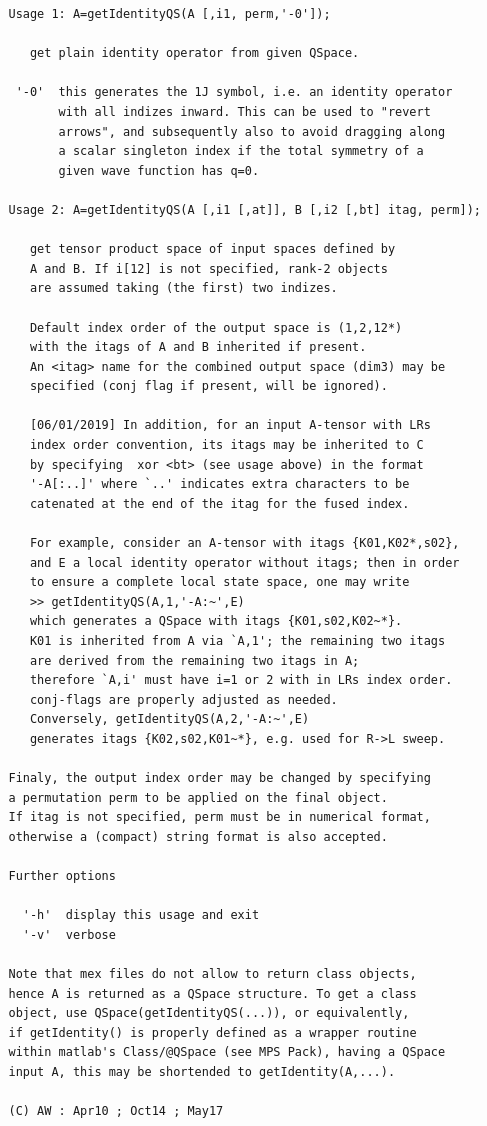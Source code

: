 \documentclass[twoside,12pt]{article}
\begin{document}
\pagebreak[3]



\begin{verbatim}
   Usage 1: A=getIdentityQS(A [,i1, perm,'-0']);
 
      get plain identity operator from given QSpace.
 
    '-0'  this generates the 1J symbol, i.e. an identity operator
          with all indizes inward. This can be used to "revert
          arrows", and subsequently also to avoid dragging along
          a scalar singleton index if the total symmetry of a
          given wave function has q=0.
 
   Usage 2: A=getIdentityQS(A [,i1 [,at]], B [,i2 [,bt] itag, perm]);
 
      get tensor product space of input spaces defined by
      A and B. If i[12] is not specified, rank-2 objects
      are assumed taking (the first) two indizes.
 
      Default index order of the output space is (1,2,12*)
      with the itags of A and B inherited if present.
      An <itag> name for the combined output space (dim3) may be
      specified (conj flag if present, will be ignored).
 
      [06/01/2019] In addition, for an input A-tensor with LRs
      index order convention, its itags may be inherited to C
      by specifying  xor <bt> (see usage above) in the format
      '-A[:..]' where `..' indicates extra characters to be
      catenated at the end of the itag for the fused index.
 
      For example, consider an A-tensor with itags {K01,K02*,s02},
      and E a local identity operator without itags; then in order
      to ensure a complete local state space, one may write
      >> getIdentityQS(A,1,'-A:~',E)
      which generates a QSpace with itags {K01,s02,K02~*}.
      K01 is inherited from A via `A,1'; the remaining two itags
      are derived from the remaining two itags in A;
      therefore `A,i' must have i=1 or 2 with in LRs index order.
      conj-flags are properly adjusted as needed.
      Conversely, getIdentityQS(A,2,'-A:~',E)
      generates itags {K02,s02,K01~*}, e.g. used for R->L sweep.
 
   Finaly, the output index order may be changed by specifying
   a permutation perm to be applied on the final object.
   If itag is not specified, perm must be in numerical format,
   otherwise a (compact) string format is also accepted.
 
   Further options
 
     '-h'  display this usage and exit
     '-v'  verbose
 
   Note that mex files do not allow to return class objects,
   hence A is returned as a QSpace structure. To get a class
   object, use QSpace(getIdentityQS(...)), or equivalently,
   if getIdentity() is properly defined as a wrapper routine
   within matlab's Class/@QSpace (see MPS Pack), having a QSpace
   input A, this may be shortended to getIdentity(A,...).
 
   (C) AW : Apr10 ; Oct14 ; May17
\end{verbatim}
\end{document}
